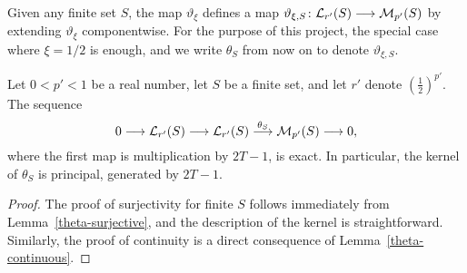 Given any finite set $S$, the map $\vartheta_{\xi}$ defines a map $\vartheta_{\xi,S}\colon \mathcal L_{r'}(S)\longrightarrow \mathcal M_{p'}(S)$ by extending $\vartheta_{\xi}$ componentwise. For the purpose of this project, the special case where $\xi=1/2$ is enough, and we write $\theta_S$ from now on to denote $\vartheta_{\xi,S}$. 


\begin{theorem}
  \label{theta-exact_finite}
  \leanok
Let $0<p'<1$ be a real number, let $S$ be a finite set, and let $r'$ denote $\left(\frac{1}{2}\right)^{p'}$. The sequence
\[
0\longrightarrow\mathcal L_{r'}(S)\longrightarrow \mathcal L_{r'}(S)\overset{\theta_S}{\longrightarrow} \mathcal M_{p'}(S)\longrightarrow 0,
\]
where the first map is multiplication by $2T-1$, is exact. In particular, the kernel of $\theta_S$ is principal, generated by $2T-1$.%
\end{theorem}
\begin{proof}
  \leanok
The proof of surjectivity for finite $S$ follows immediately from Lemma~\ref{theta-surjective}, and the description of the kernel is straightforward. Similarly, the proof of continuity is a direct consequence of Lemma~\ref{theta-continuous}.
\end{proof}



